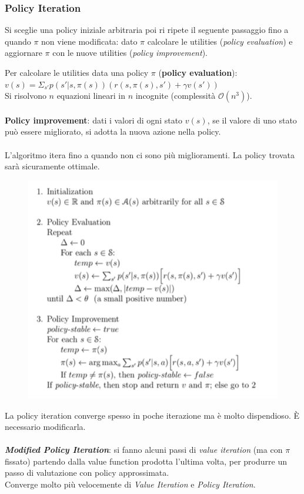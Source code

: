 \documentclass[a4paper, notitlepage, 9pt]{extreport}
\begin{document}
\subsubsection*{Policy Iteration}
Si sceglie una policy iniziale arbitraria poi ri ripete il seguente passaggio fino a quando $\pi$ non viene modificata: dato $\pi$ calcolare le utilities (\textit{policy evaluation}) e aggiornare $\pi$ con le nuove utilities (\textit{policy improvement}).\\
\begin{multicols}{2}
	\noindent
	Per calcolare le utilities data una policy $\pi$ (\textbf{policy evaluation}): ~~$v(s) = \Sigma_{s'} p(s' | s, \pi(s)) (r(s, \pi(s), s') + \gamma v(s'))$\\
	Si risolvono $n$ equazioni lineari in $n$ incognite (complessità $\mathcal{O}(n^3)$).\\\\
	\textbf{Policy improvement}: dati i valori di ogni stato $v(s)$, se il valore di uno stato può essere migliorato, si adotta la nuova azione nella policy.\\\\
	L'algoritmo itera fino a quando non ci sono più miglioramenti. La policy trovata sarà sicuramente ottimale.
	\columnbreak
	\begin{figure}[H]
		\centering
		\includegraphics[scale=0.49]{PI}
	\end{figure}
\end{multicols}
\noindent
La policy iteration converge spesso in poche iterazione ma è molto dispendioso. È necessario modificarla.\\\\
\textit{\textbf{Modified Policy Iteration}}: si fanno alcuni passi di \textit{value iteration} (ma con $\pi$ fissato) partendo dalla value function prodotta l'ultima volta, per produrre un passo di valutazione con policy approssimata.\\
Converge molto più velocemente di \textit{Value Iteration} e \textit{Policy Iteration}.
\end{document}
